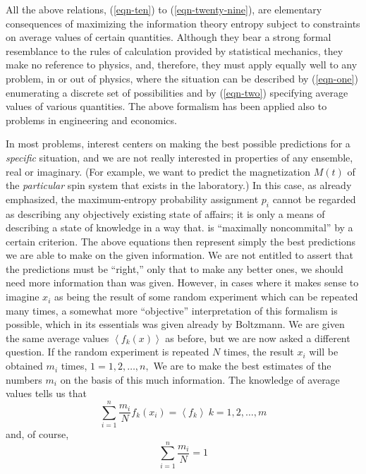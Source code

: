 \documentclass[]{article}
\begin{document}
All the above relations, (\ref{eqn-ten}) to (\ref{eqn-twenty-nine}), are elementary consequences of
maximizing the information theory entropy subject to constraints on
average values of certain quantities. Although they bear a strong formal
resemblance to the rules of calculation provided by statistical
mechanics, they make no reference to physics, and, therefore, they must
apply equally well to any problem, in or out of physics, where the
situation can be described by (\ref{eqn-one}) enumerating a discrete set of
possibilities and by (\ref{eqn-two}) specifying average values of various
quantities. The above formalism has been applied also to problems in
engineering\citep{Jaynes-decipherability59} and economics.\citep{Jaynes-engineering63}

In most problems, interest centers on making the best possible
predictions for a \emph{specific} situation, and we are not really
interested in properties of any ensemble, real or imaginary. (For
example, we want to predict the magnetization \(M(t)\) of the
\emph{particular} spin system that exists in the laboratory.) In this
case, as already emphasized, the maximum-entropy probability assignment
\(p_{i}\) cannot be regarded as describing any objectively existing
state of affairs; it is only a means of describing a state of knowledge
in a way that. is ``maximally noncommital'' by a certain criterion. The above equations then represent simply the best predictions we are
able to make on the given information. We are not entitled to assert
that the predictions must be ``right,'' only that to make any better
ones, we should need more information than was given. However, in cases
where it makes sense to imagine \(x_{i}\) as being the result of some
random experiment which can be repeated many times, a somewhat more
``objective'' interpretation of this formalism is possible, which in
its essentials was given already by Boltzmann. We are given the same
average values \(\left\langle f_{k}(x) \right\rangle\) as before, but we
are now asked a different question. If the random experiment is repeated
\(N\) times, the result \(x_{i}\) will be obtained \(m_{i}\) times,
\(1 = 1,2,\ldots,n,\) We are to make the best estimates of the numbers
\(m_{i}\) on the basis of this much information. The knowledge of
average values tells us that
%
\begin{equation}
\sum_{i = 1}^{n} \frac{m_{i}}{N}f_{k}\left( x_{i} \right) = \left\langle f_{k} \right\rangle\ k = 1,2,\ldots,m \label{eqn-thirty}
\end{equation}
%
and, of course,
%
\begin{equation}
\sum_{i = 1}^{n} \frac{m_{i}}{N} = 1 \label{eqn-thirty-one}
\end{equation}
\end{document}
